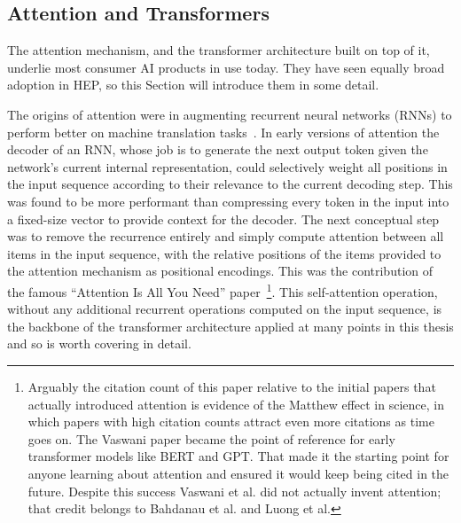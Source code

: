 \subsection{Attention and Transformers}
\label{sec:attention}

The attention mechanism, and the transformer architecture built on top of it, underlie most consumer AI products in use today.
They have seen equally broad adoption in HEP, so this Section will introduce them in some detail.

The origins of attention were in augmenting recurrent neural networks (RNNs) to perform better on machine translation tasks~\cite{bahdanau2014neural, luong2015effective, cheng2016long, lin2017structured}.
In early versions of attention the decoder of an RNN, whose job is to generate the next output token given the network's current internal representation, could selectively weight all positions in the input sequence according to their relevance to the current decoding step.
This was found to be more performant than compressing every token in the input into a fixed-size vector to provide context for the decoder.
The next conceptual step was to remove the recurrence entirely and simply compute attention between all items in the input sequence, with the relative positions of the items provided to the attention mechanism as positional encodings.
This was the contribution of the famous ``Attention Is All You Need'' paper~\cite{Vaswani:2017attention}\footnote{Arguably the citation count of this paper relative to the initial papers that actually introduced attention is evidence of the Matthew effect in science, in which papers with high citation counts attract even more citations as time goes on. The Vaswani paper became the point of reference for early transformer models like BERT and GPT. That made it the starting point for anyone learning about attention and ensured it would keep being cited in the future. Despite this success Vaswani et al. did not actually invent attention; that credit belongs to Bahdanau et al. and Luong et al.}.
This self-attention operation, without any additional recurrent operations computed on the input sequence, is the backbone of the transformer architecture applied at many points in this thesis and so is worth covering in detail.

